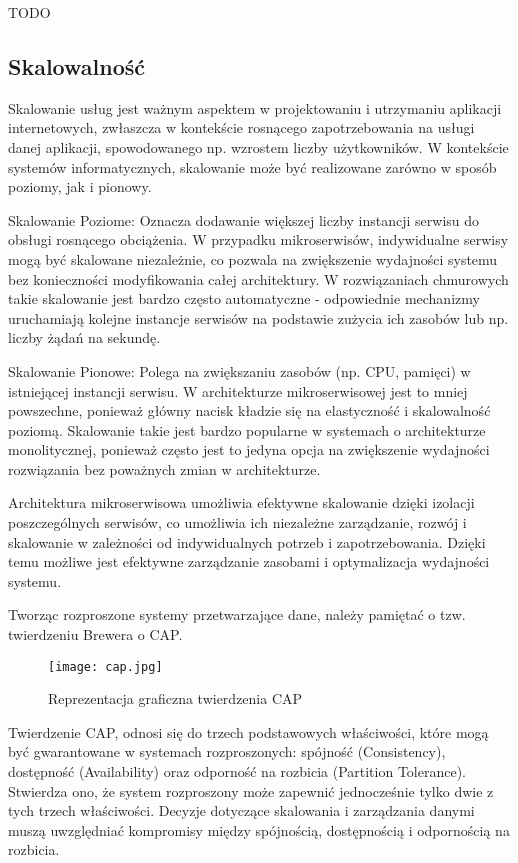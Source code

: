 TODO

\subsection{Skalowalność}

Skalowanie usług jest ważnym aspektem w projektowaniu i utrzymaniu aplikacji internetowych, zwłaszcza w kontekście rosnącego zapotrzebowania na usługi danej aplikacji, spowodowanego np. wzrostem liczby użytkowników. W kontekście systemów informatycznych, skalowanie może być realizowane zarówno w sposób poziomy, jak i pionowy.

Skalowanie Poziome: Oznacza dodawanie większej liczby instancji serwisu do obsługi rosnącego obciążenia. W przypadku mikroserwisów, indywidualne serwisy mogą być skalowane niezależnie, co pozwala na zwiększenie wydajności systemu bez konieczności modyfikowania całej architektury. W rozwiązaniach chmurowych takie skalowanie jest bardzo często automatyczne - odpowiednie mechanizmy uruchamiają kolejne instancje serwisów na podstawie zużycia ich zasobów lub np. liczby żądań na sekundę.

Skalowanie Pionowe: Polega na zwiększaniu zasobów (np. CPU, pamięci) w istniejącej instancji serwisu. W architekturze mikroserwisowej jest to mniej powszechne, ponieważ główny nacisk kładzie się na elastyczność i skalowalność poziomą. Skalowanie takie jest bardzo popularne w systemach o architekturze monolitycznej, ponieważ często jest to jedyna opcja na zwiększenie wydajności rozwiązania bez poważnych zmian w architekturze.

Architektura mikroserwisowa umożliwia efektywne skalowanie dzięki izolacji poszczególnych serwisów, co umożliwia ich niezależne zarządzanie, rozwój i skalowanie w zależności od indywidualnych potrzeb i zapotrzebowania. Dzięki temu możliwe jest efektywne zarządzanie zasobami i optymalizacja wydajności systemu.

Tworząc rozproszone systemy przetwarzające dane, należy pamiętać o tzw. twierdzeniu Brewera o CAP.

\begin{figure}[!h]
    \centering \texttt{[image: cap.jpg]}
    \caption{Reprezentacja graficzna twierdzenia CAP \cite{rys2}}
\end{figure}

Twierdzenie CAP, odnosi się do trzech podstawowych właściwości, które mogą być gwarantowane w systemach rozproszonych: spójność (Consistency), dostępność (Availability) oraz odporność na rozbicia (Partition Tolerance). Stwierdza ono, że system rozproszony może zapewnić jednocześnie tylko dwie z tych trzech właściwości. Decyzje dotyczące skalowania i zarządzania danymi muszą uwzględniać kompromisy między spójnością, dostępnością i odpornością na rozbicia.

